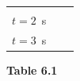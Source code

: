 {{\begin{center}
\begin{xtabular}[t]{|l|l|l|}
    
         &
    
    
     \tabularnewline{}
    
    
        \begin{math}t=2\end{math}~s &
    
    
         &
    
    
     \tabularnewline{}
    
    
        \begin{math}t=3\end{math}~s &
    
    
         &
    
    
     \tabularnewline{}
    \end{xtabular}
      \end{center}
    \begin{center}{\small\bfseries Table 6.1}\end{center}
    
}}
